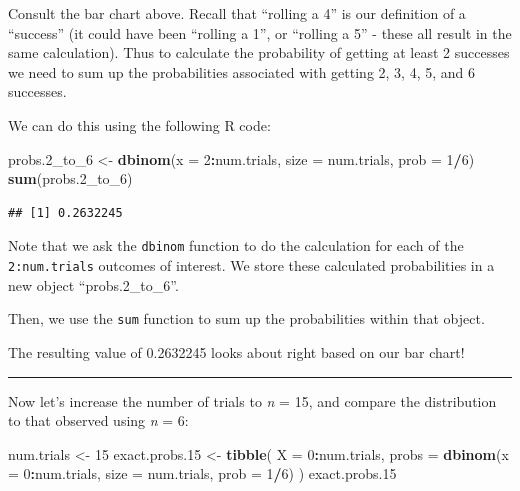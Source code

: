 \documentclass[
]{book}
\newenvironment{Shaded}{\begin{snugshade}}{\end{snugshade}}
\newcommand{\AttributeTok}[1]{\textcolor[rgb]{0.13,0.29,0.53}{#1}}
\newcommand{\DecValTok}[1]{\textcolor[rgb]{0.00,0.00,0.81}{#1}}
\newcommand{\FloatTok}[1]{\textcolor[rgb]{0.00,0.00,0.81}{#1}}
\newcommand{\FunctionTok}[1]{\textcolor[rgb]{0.13,0.29,0.53}{\textbf{#1}}}
\newcommand{\NormalTok}[1]{#1}
\newcommand{\OtherTok}[1]{\textcolor[rgb]{0.56,0.35,0.01}{#1}}
\newcommand{\SpecialCharTok}[1]{\textcolor[rgb]{0.81,0.36,0.00}{\textbf{#1}}}
\begin{document}
Consult the bar chart above. Recall that ``rolling a 4'' is our definition of a ``success'' (it could have been ``rolling a 1'', or ``rolling a 5'' - these all result in the same calculation). Thus to calculate the probability of getting at least 2 successes we need to sum up the probabilities associated with getting 2, 3, 4, 5, and 6 successes.

We can do this using the following R code:

\begin{Shaded}
\begin{Highlighting}[]
\NormalTok{probs}\FloatTok{.2}\NormalTok{\_to\_6 }\OtherTok{\textless{}{-}} \FunctionTok{dbinom}\NormalTok{(}\AttributeTok{x =} \DecValTok{2}\SpecialCharTok{:}\NormalTok{num.trials, }\AttributeTok{size =}\NormalTok{ num.trials, }\AttributeTok{prob =} \DecValTok{1}\SpecialCharTok{/}\DecValTok{6}\NormalTok{)}
\FunctionTok{sum}\NormalTok{(probs}\FloatTok{.2}\NormalTok{\_to\_6)}
\end{Highlighting}
\end{Shaded}

\begin{verbatim}
## [1] 0.2632245
\end{verbatim}

Note that we ask the \texttt{dbinom} function to do the calculation for each of the \texttt{2:num.trials} outcomes of interest. We store these calculated probabilities in a new object ``probs.2\_to\_6''.

Then, we use the \texttt{sum} function to sum up the probabilities within that object.

The resulting value of 0.2632245 looks about right based on our bar chart!

\begin{center}\rule{0.5\linewidth}{0.5pt}\end{center}

Now let's increase the number of trials to \emph{n} = 15, and compare the distribution to that observed using \emph{n} = 6:

\begin{Shaded}
\begin{Highlighting}[]
\NormalTok{num.trials }\OtherTok{\textless{}{-}} \DecValTok{15}
\NormalTok{exact.probs}\FloatTok{.15} \OtherTok{\textless{}{-}} \FunctionTok{tibble}\NormalTok{(}
  \AttributeTok{X =} \DecValTok{0}\SpecialCharTok{:}\NormalTok{num.trials,}
  \AttributeTok{probs =} \FunctionTok{dbinom}\NormalTok{(}\AttributeTok{x =} \DecValTok{0}\SpecialCharTok{:}\NormalTok{num.trials, }\AttributeTok{size =}\NormalTok{ num.trials, }\AttributeTok{prob =} \DecValTok{1}\SpecialCharTok{/}\DecValTok{6}\NormalTok{)}
\NormalTok{  )}
\NormalTok{exact.probs}\FloatTok{.15}
\end{Highlighting}
\end{Shaded}
\end{document}
